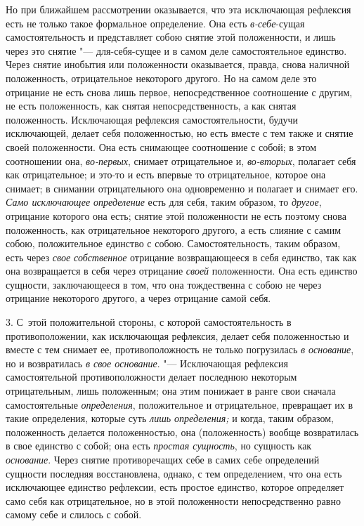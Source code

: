 Но при ближайшем рассмотрении оказывается, что эта исключающая рефлексия
есть не только такое формальное определение. Она есть
{\em в-себе}{}-сущая самостоятельность и представляет
собою снятие этой положенности, и лишь через это снятие "--- для-себя-сущее и
в самом деле самостоятельное единство. Через снятие инобытия или
положенности оказывается, правда, снова наличной положенность,
отрицательное некоторого другого. Но на самом деле это отрицание не есть
снова лишь первое, непосредственное соотношение с другим, не есть
положенность, как снятая непосредственность, а как снятая положенность.
Исключающая рефлексия самостоятельности, будучи исключающей, делает себя
положенностью, но есть вместе с тем также и снятие своей положенности. Она
есть снимающее соотношение с собой; в этом соотношении она,
{\em во-первых}, снимает отрицательное и,
{\em во-вторых}, полагает себя как отрицательное; и
это-то и есть впервые то отрицательное, которое она снимает; в снимании
отрицательного она одновременно и полагает и снимает его.
{\em Само исключающее определение} есть для себя, таким
образом, то {\em другое}, отрицание которого она есть;
снятие этой положенности не есть поэтому снова положенность, как
отрицательное некоторого другого, а есть слияние с самим собою,
положительное единство с собою. Самостоятельность, таким образом, есть
через {\em свое собственное} отрицание возвращающееся в
себя единство, так как она возвращается в себя через отрицание
{\em своей} положенности. Она есть единство сущности,
заключающееся в том, что она тождественна с собою не через отрицание
некоторого другого, а через отрицание самой себя.

3. С~этой положительной стороны, с которой самостоятельность в
противоположении, как исключающая рефлексия, делает себя положенностью и
вместе с тем снимает ее, противоположность не только погрузилась
{\em в основание}, но и возвратилась
{\em в свое основание}. "--- Исключающая рефлексия
самостоятельной противоположности делает последнюю некоторым отрицательным,
лишь положенным; она этим понижает в ранге свои сначала самостоятельные
{\em определения}, положительное и отрицательное,
превращает их в такие определения, которые суть
{\em лишь определения;} и когда, таким образом,
положенность делается положенностью, она (положенность) вообще возвратилась
в свое единство с собой; она есть {\em простая
сущность}, но сущность как {\em основание}. Через
снятие противоречащих себе в самих себе определений сущности последняя
восстановлена, однако, с тем определением, что она есть исключающее
единство рефлексии, есть простое единство, которое определяет само себя как
отрицательное, но в этой положенности непосредственно равно самому себе и
слилось с собой.

